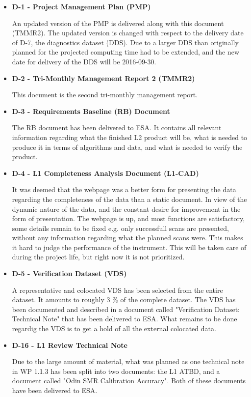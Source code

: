 \begin{itemize}

\item{\bf D-1 - Project Management Plan (PMP)}

An updated version of the PMP is delivered along with this document (TMMR2).
The updated version is changed with respect to the delivery date of D-7, the diagnostics dataset (DDS). Due to a larger DDS than originally planned for the projected computing time had to be extended, and the new date for delivery of the DDS will be 2016-09-30.  

\item{\bf D-2 - Tri-Monthly Management Report 2 (TMMR2)}

This document is the second tri-monthly management report.

\item{\bf D-3 - Requirements Baseline (RB) Document}

The RB document has been delivered to ESA. It contains all relevant information regarding what the finished L2 product will be, what is needed to produce it in terms of algorithms and data, and what is needed to verify the product. 


\item{\bf D-4 - L1 Completeness Analysis Document (L1-CAD)}

It was deemed that the webpage was a better form for presenting the data regarding the completeness of the data than a static document. In view of the dynamic nature of the data, and the constant desire for improvement in the form of presentation. The webpage is up, and most functions are satisfactory, some details remain to be fixed e.g. only successfull scans are presented, without any information regarding what the planned scans were. This makes it hard to judge the performance of the instrument. This will be taken care of during the project life, but right now it is not prioritized. 


\item{\bf D-5 - Verification Dataset (VDS)}

A representative and colocated VDS has been selected from the entire dataset. It amounts to roughly 3 \% of the complete dataset. The VDS has been documented and described in a document called "Verification Dataset: Technical Note" that has been delivered to ESA. What remains to be done regardig the VDS is to get a hold of all the external colocated data.


\item{\bf D-16 - L1 Review Technical Note}

Due to the large amount of material, what was planned as one technical note in WP
1.1.3 has been split into two documents: the L1 ATBD, and a document called "Odin
SMR Calibration Accuracy". Both of these documents have been delivered to ESA. 

\end{itemize}

